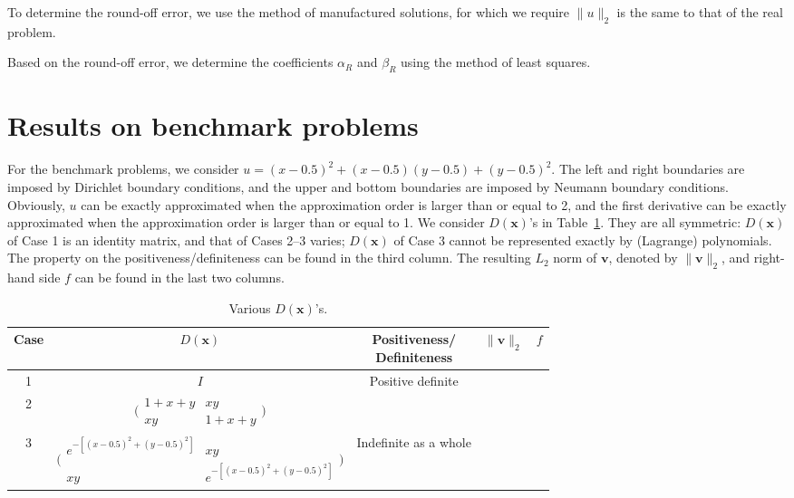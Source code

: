 \documentclass[review,3p]{elsarticle}
\begin{document}
To determine the round-off error, we use the method of manufactured solutions, for which we require $\|u\|_2$ is the same to that of the real problem.

Based on the round-off error, we determine the coefficients $\alpha_{R}$ and $\beta_{R}$ using the method of least squares.

\newpage
\section{Results on benchmark problems}  	\label{section_benchmark_problems}

For the benchmark problems, we consider $u=(x-0.5)^2+(x-0.5)(y-0.5)+(y-0.5)^2$. The left and right boundaries are imposed by Dirichlet boundary conditions, and the upper and bottom boundaries are imposed by Neumann boundary conditions. Obviously, $u$ can be exactly approximated when the approximation order is larger than or equal to 2, and the first derivative can be exactly approximated when the approximation order is larger than or equal to 1.
We consider $D(\mathbf{x})$'s in Table~\ref{expression_coefficient_d}. 
They are all symmetric: $D(\mathbf{x})$ of Case 1 is an identity matrix, and that of Cases 2--3 varies; $D(\mathbf{x})$ of Case 3 cannot be represented exactly by (Lagrange) polynomials.
The property on the positiveness/definiteness can be found in the third column. 
The resulting $L_2$ norm of $\mathbf{v}$, denoted by $\| \mathbf{v} \|_2$, and right-hand side $f$ can be found in the last two columns.

\begin{table}[!ht]
\centering
\caption{Various $D(\mathbf{x})$'s.}
\small
\label{expression_coefficient_d}
  \begin{tabular}{c|c|c|c|c}
    Case & $D(\mathbf{x})$ & \makecell{Positiveness/ \\Definiteness} & $\| \mathbf{v} \|_2$ & $f$ \\ \hline
    1 & $I$& \multirow{2}{*}{Positive definite} &  &  \\ \cline{1-2} \cline{4-5}
    2 & $\big(\begin{smallmatrix} 1+x+y & xy \\ xy & 1+x+y \end{smallmatrix} \big)$ &  &  &  \\ \cline{1-5}
    3 & $\big(\begin{smallmatrix} e^{-[(x-0.5)^2+(y-0.5)^2]} & xy \\ xy & e^{-[(x-0.5)^2+(y-0.5)^2]} \end{smallmatrix} \big)$ & Indefinite as a whole & &  \\ 
  \end{tabular}
\end{table}
\end{document}
